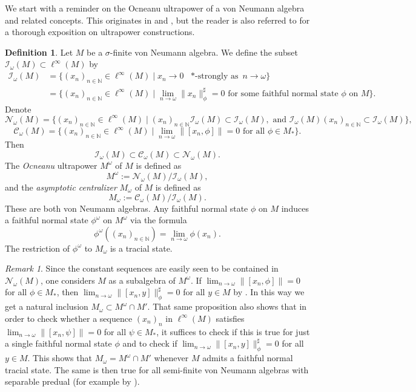 \documentclass[11pt,a4paper]{article}
\theoremstyle{definition}
\newtheorem{definition}[theorem]{Definition}
\theoremstyle{remark}
\newtheorem{remark}[theorem]{Remark}
\numberwithin{equation}{section}
\numberwithin{theorem}{section}
\newcommand{\N}{\mathbb{N}}
\begin{document}
We start with a reminder on the Ocneanu ultrapower of a von Neumann algebra and related concepts.
This originates in \cite[Section 2]{Connes74} and \cite[Section 5]{Ocneanu85}, but the reader is also referred to \cite{AndoHaagerup14} for a thorough exposition on ultrapower constructions.

\begin{definition}
Let $M$ be a $\sigma$-finite von Neumann algebra. We define the subset $\mathcal{I}_\omega(M) \subset \ell^\infty(M)$ by
\begin{align*}
\mathcal{I}_\omega(M) &= \{(x_n)_{n \in \N} \in \ell^\infty(M) \mid x_n \rightarrow 0 \text{ $*$-strongly as } n \rightarrow \omega\}\\
&= \{(x_n)_{n \in \N} \in \ell^\infty(M) \mid \lim_{n \rightarrow \omega}\|x_n\|_{\phi}^\sharp =0 \text{ for some faithful normal state } \phi \text{ on } M\}.
\end{align*}
Denote \[\mathcal{N}_\omega(M)=\{(x_n)_{n \in \N} \in \ell^\infty(M) \mid (x_n)_{n \in \N} \mathcal{I}_\omega(M) \subset \mathcal{I}_\omega(M), \text{ and } \mathcal{I}_\omega(M)(x_n)_{n \in \N} \subset \mathcal{I}_\omega(M)\},\] 
\[\mathcal{C}_\omega(M) =\{(x_n)_{n \in \N} \in \ell^\infty(M) \mid \lim_{n \rightarrow \omega}\|[x_n,\phi]\| = 0 \text{ for all } \phi \in M_*\}.\]
Then \[{\mathcal{I}_\omega(M) \subset \mathcal{C}_\omega(M) \subset \mathcal{N}_\omega(M)}.\] 
The \emph{Ocneanu} ultrapower $M^\omega$ of $M$ is defined as
\[M^\omega := \mathcal{N}_\omega(M)/\mathcal{I}_\omega(M),\]
and the \emph{asymptotic centralizer} $M_\omega$ of $M$ is defined as
\[M_\omega := \mathcal{C}_\omega(M)/\mathcal{I}_\omega(M).\]
These are both von Neumann algebras. 
Any faithful normal state $\phi$ on $M$ induces a faithful normal state $\phi^\omega$ on $M^\omega$ via the formula
\[\phi^\omega((x_n)_{n \in \N}) = \lim_{n \rightarrow \omega} \phi(x_n).\]
The restriction of $\phi^\omega$ to $M_\omega$ is a tracial state.
\end{definition}

\begin{remark}
Since the constant sequences are easily seen to be contained in $\mathcal{N}_\omega(M)$, one considers $M$ as a subalgebra of $M^\omega$.
If $\lim_{n \rightarrow \omega}\|[x_n,\phi]\| = 0$ for all $\phi \in M_*$, then $\lim_{n \rightarrow \omega}\|[x_n,y]\|_\phi^\sharp = 0$ for all $y \in M$ by  \cite[Proposition 2.8]{Connes74}.
  In this way we get a natural inclusion $M_\omega \subset M^\omega \cap M'$.
   That same proposition also shows that in order to check whether a sequence $(x_n)_n$ in $\ell^\infty(M)$ satisfies $\lim_{n \rightarrow \omega}\|[x_n,\psi]\| = 0$ for all $\psi \in M_*$, it suffices to check if this is true for just a single faithful normal state $\phi$ and to check if $\lim_{n \rightarrow \omega}\|[x_n,y]\|^\sharp_\phi =0$ for all $y \in M$.
    This shows that $M_\omega = M^\omega \cap M'$ whenever $M$ admits a faithful normal tracial state. The same is then true for all semi-finite von Neumann algebras with separable predual (for example by \cite[Lemma~2.8]{MasudaTomatsu16}).
\end{remark}
\end{document}
